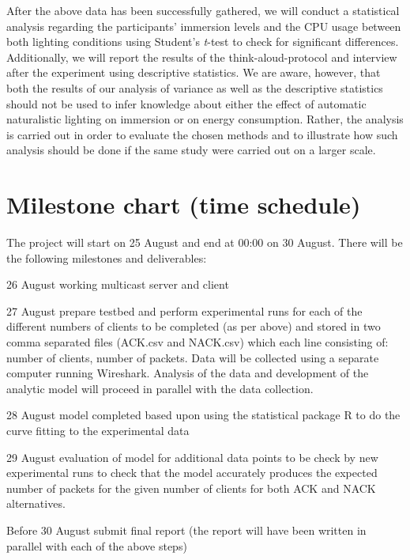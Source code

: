 \documentclass[12pt,twoside,english]{article}
\begin{document}
After the above data has been successfully gathered, we will conduct a statistical analysis regarding the participants' immersion levels and the CPU usage between both lighting conditions using Student's \textit{t}-test \cite{} to check for significant differences.
Additionally, we will report the results of the think-aloud-protocol and interview after the experiment using descriptive statistics.
We are aware, however, that both the results of our analysis of variance as well as the descriptive statistics should not be used to infer knowledge about either the effect of automatic naturalistic lighting on immersion or on energy consumption.
Rather, the analysis is carried out in order to evaluate the chosen methods and to illustrate how such analysis should be done if the same study were carried out on a larger scale.

\section{Milestone chart (time schedule)}
\label{sect:milestones}

The project will start on 25 August and end at 00:00 on 30 August. There will be the following milestones and deliverables:

\begin{description}
\item{26 August} working multicast server and client

\item{27 August} prepare testbed and perform experimental runs for each of the
  different numbers of clients to be completed (as per above) and stored in
  two comma separated files (ACK.csv and NACK.csv) which each line consisting
  of: number of clients, number of packets. Data will be collected using a
  separate computer running Wireshark. Analysis of the data and development of
  the analytic model will proceed in parallel with the data collection.

\item{28 August} model completed based upon using the statistical package R to do the curve fitting to the experimental data

\item{29 August} evaluation of model for additional data points to be check by new experimental runs to check that the model accurately produces the expected number of packets for the given number of clients for both ACK and NACK alternatives.

\item{Before 30 August} submit final report (the report will have been written in parallel with each of the above steps)
\end{description}
\end{document}
